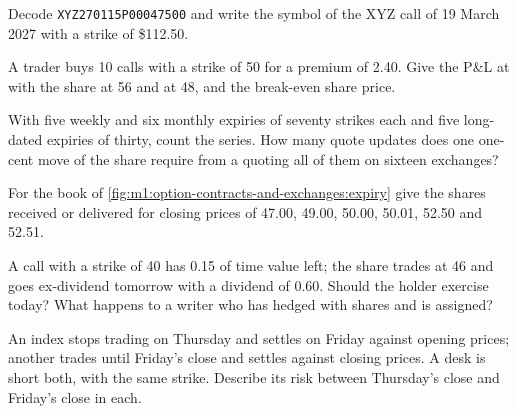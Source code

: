 \begin{exercise}[$\star$]\label{exo:m1:option-contracts-and-exchanges:1}
Decode \texttt{XYZ\textvisiblespace\textvisiblespace\textvisiblespace270115P00047500}
and write the symbol of the XYZ call of 19 March 2027 with a strike of
\$112.50.
\end{exercise}

\begin{exercise}[$\star$]\label{exo:m1:option-contracts-and-exchanges:2}
A trader buys 10 calls with a strike of 50 for a premium of 2.40. Give the
P\&L at  with the share at 56 and at 48, and the break-even share
price.
\end{exercise}

\begin{exercise}[$\star$]\label{exo:m1:option-contracts-and-exchanges:3}
With five weekly and six monthly expiries of seventy strikes each and five
long-dated expiries of thirty, count the series. How many quote updates does
one one-cent move of the share require from a  quoting all of
them on sixteen exchanges?
\end{exercise}

\begin{exercise}[$\star\star$]\label{exo:m1:option-contracts-and-exchanges:4}
For the book of \cref{fig:m1:option-contracts-and-exchanges:expiry} give the
shares received or delivered for closing prices of 47.00, 49.00, 50.00,
50.01, 52.50 and 52.51.
\end{exercise}

\begin{exercise}[$\star\star$]\label{exo:m1:option-contracts-and-exchanges:5}
A call with a strike of 40 has 0.15 of time value left; the share trades at
46 and goes ex-dividend tomorrow with a dividend of 0.60. Should the holder
exercise today? What happens to a writer who has hedged with shares and is
assigned?
\end{exercise}

\begin{exercise}[$\star\star$]\label{exo:m1:option-contracts-and-exchanges:6}
An index  stops trading on Thursday and settles on Friday
against opening prices; another trades until Friday's close and settles
against closing prices. A desk is short both, with the same strike. Describe
its risk between Thursday's close and Friday's close in each.
\end{exercise}

